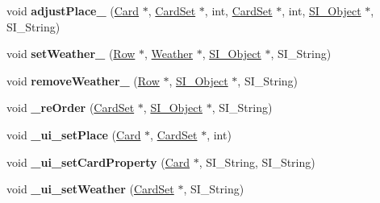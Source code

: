 \begin{DoxyCompactItemize}
void {\bfseries adjust\+Place\+\_\+} (\hyperlink{class_card}{Card} $\ast$, \hyperlink{class_card_set}{Card\+Set} $\ast$, int, \hyperlink{class_card_set}{Card\+Set} $\ast$, int, \hyperlink{class_s_i___object}{S\+I\+\_\+\+Object} $\ast$, S\+I\+\_\+\+String)
\item 
\mbox{\label{class_field_a0dbace96132045e1277520a54cb1b2ac}} 
void {\bfseries set\+Weather\+\_\+} (\hyperlink{class_card_set}{Row} $\ast$, \hyperlink{class_weather}{Weather} $\ast$, \hyperlink{class_s_i___object}{S\+I\+\_\+\+Object} $\ast$, S\+I\+\_\+\+String)
\item 
\mbox{\label{class_field_a407e40c1ceb1bec6b2cf0b575d174b84}} 
void {\bfseries remove\+Weather\+\_\+} (\hyperlink{class_card_set}{Row} $\ast$, \hyperlink{class_s_i___object}{S\+I\+\_\+\+Object} $\ast$, S\+I\+\_\+\+String)
\item 
\mbox{\label{class_field_a761307a0a60844e98157b31fc5c88654}} 
void {\bfseries \+\_\+re\+Order} (\hyperlink{class_card_set}{Card\+Set} $\ast$, \hyperlink{class_s_i___object}{S\+I\+\_\+\+Object} $\ast$, S\+I\+\_\+\+String)
\item 
\mbox{\label{class_field_ad50dfaf6563d82ed65418c6bdadedcda}} 
void {\bfseries \+\_\+ui\+\_\+set\+Place} (\hyperlink{class_card}{Card} $\ast$, \hyperlink{class_card_set}{Card\+Set} $\ast$, int)
\item 
\mbox{\label{class_field_adad6bc297db1991a1b3b2fbba6668a6a}} 
void {\bfseries \+\_\+ui\+\_\+set\+Card\+Property} (\hyperlink{class_card}{Card} $\ast$, S\+I\+\_\+\+String, S\+I\+\_\+\+String)
\item 
\mbox{\label{class_field_ab30e6a5e3ad545c3e5c4bea4cf0a2a0f}} 
void {\bfseries \+\_\+ui\+\_\+set\+Weather} (\hyperlink{class_card_set}{Card\+Set} $\ast$, S\+I\+\_\+\+String)
\end{DoxyCompactItemize}
